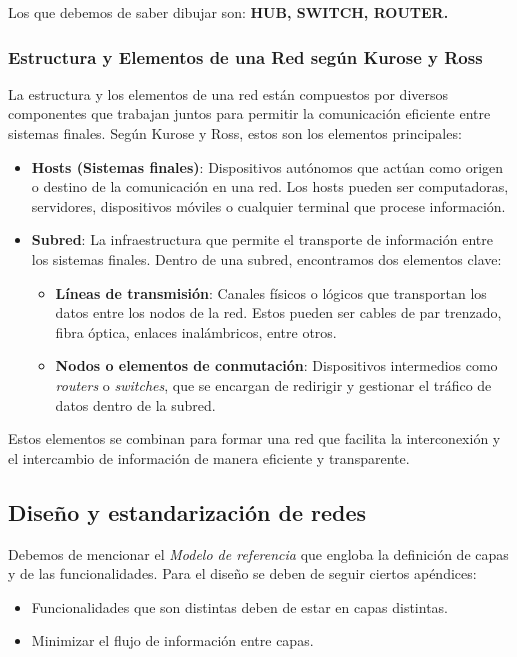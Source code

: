 \documentclass[a4paper,12pt]{article}
\begin{document}
Los que debemos de saber dibujar son: \textbf{HUB, SWITCH, ROUTER.}

\subsubsection{Estructura y Elementos de una Red según Kurose y Ross}

La estructura y los elementos de una red están compuestos por diversos componentes que trabajan juntos para permitir la comunicación eficiente entre sistemas finales. Según Kurose y Ross, estos son los elementos principales:

\begin{itemize}
    \item \textbf{Hosts (Sistemas finales)}: 
    Dispositivos autónomos que actúan como origen o destino de la comunicación en una red. Los hosts pueden ser computadoras, servidores, dispositivos móviles o cualquier terminal que procese información.

    \item \textbf{Subred}: 
    La infraestructura que permite el transporte de información entre los sistemas finales. Dentro de una subred, encontramos dos elementos clave:
    \begin{itemize}
        \item \textbf{Líneas de transmisión}: Canales físicos o lógicos que transportan los datos entre los nodos de la red. Estos pueden ser cables de par trenzado, fibra óptica, enlaces inalámbricos, entre otros.
        \item \textbf{Nodos o elementos de conmutación}: Dispositivos intermedios como \textit{routers} o \textit{switches}, que se encargan de redirigir y gestionar el tráfico de datos dentro de la subred.
    \end{itemize}
\end{itemize}

Estos elementos se combinan para formar una red que facilita la interconexión y el intercambio de información de manera eficiente y transparente.

\subsection{Diseño y estandarización de redes}

Debemos de mencionar el \textit{Modelo de referencia} que engloba la definición de capas y de las funcionalidades. Para el diseño se deben de seguir ciertos apéndices:
\begin{itemize}
    \item Funcionalidades que son distintas deben de estar en capas distintas.
    \item Minimizar el flujo de información entre capas.
\end{itemize}
\end{document}
